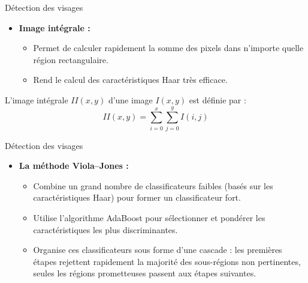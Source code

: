 \documentclass{beamer}
\begin{document}
\begin{frame}{Détection des visages}
    \begin{itemize}
        \item \textbf{Image intégrale :}  
              \begin{itemize}
                  \item Permet de calculer rapidement la somme des pixels dans n'importe quelle région rectangulaire.
                  \item Rend le calcul des caractéristiques Haar très efficace.
              \end{itemize}
    \end{itemize}
    \vspace{0.5cm}
    L'image intégrale \( II(x,y) \) d'une image \( I(x,y) \) est définie par :
    \[
        II(x,y) = \sum_{i=0}^{x} \sum_{j=0}^{y} I(i,j)
    \]
\end{frame}


\begin{frame}{Détection des visages}
    \begin{itemize}
        
        \item \textbf{La méthode Viola–Jones :}  
              \begin{itemize}
                  \item Combine un grand nombre de classificateurs faibles (basés sur les caractéristiques Haar) pour former un classificateur fort.
                  \item Utilise l'algorithme AdaBoost pour sélectionner et pondérer les caractéristiques les plus discriminantes.
                  \item Organise ces classificateurs sous forme d'une cascade : les premières étapes rejettent rapidement la majorité des sous-régions non pertinentes, seules les régions prometteuses passent aux étapes suivantes.
              \end{itemize}
    \end{itemize}
\end{frame}
\end{document}
